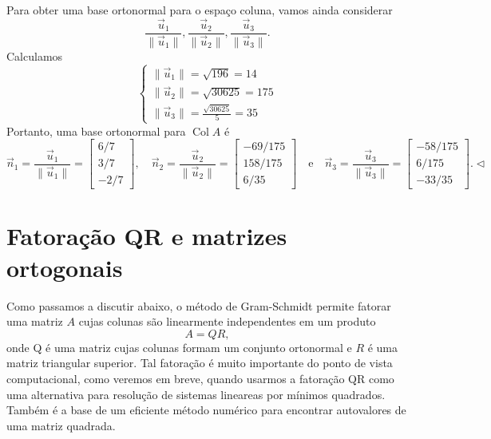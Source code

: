 \begin{ex}
  Para obter uma base ortonormal para o espaço coluna, vamos ainda considerar
\begin{equation}
\frac{\vec{u}_1}{\|\vec{u}_1\|}, \frac{\vec{u}_2}{\|\vec{u}_2\|}, \frac{\vec{u}_3}{\|\vec{u}_3\|}.
\end{equation} Calculamos
\begin{equation}
\left\{
  \begin{array}{ll}
   \|\vec{u}_1\| = \sqrt{196} = 14 \\
   \|\vec{u}_2\| = \sqrt{30625} = 175 \\
   \|\vec{u}_3\| = \frac{\sqrt{30625}}{5} = 35
  \end{array}
\right.
\end{equation} Portanto, uma base ortonormal para $\operatorname{Col} A$ é
\begin{equation}
\vec{n}_1 = \frac{\vec{u}_1}{\|\vec{u}_1\|} =
\begin{bmatrix}
 6/7  \\
 3/7  \\
 -2/7
\end{bmatrix}, \quad
\vec{n}_2 = \frac{\vec{u}_2}{\|\vec{u}_2\|} =
\begin{bmatrix}
 -69/175  \\
 158/175  \\
 6/35
\end{bmatrix} \quad \text{e} \quad
\vec{n}_3 = \frac{\vec{u}_3}{\|\vec{u}_3\|} =
\begin{bmatrix}
 -58/175  \\
 6/175  \\
 -33/35
\end{bmatrix}. \lhd
\end{equation}
\end{ex}


\section{Fatoração QR e matrizes ortogonais}


Como passamos a discutir abaixo, o método de Gram-Schmidt permite fatorar uma matriz $A$ cujas colunas são linearmente independentes em um produto \begin{equation}A=QR,\end{equation} onde Q é uma matriz cujas colunas formam um conjunto ortonormal e $R$ é uma matriz triangular superior. Tal fatoração é muito importante do ponto de vista computacional, como veremos em breve, quando usarmos a fatoração QR como uma alternativa para resolução de sistemas lineareas por mínimos quadrados. Também é a base de um eficiente método numérico para encontrar autovalores de uma matriz quadrada.

